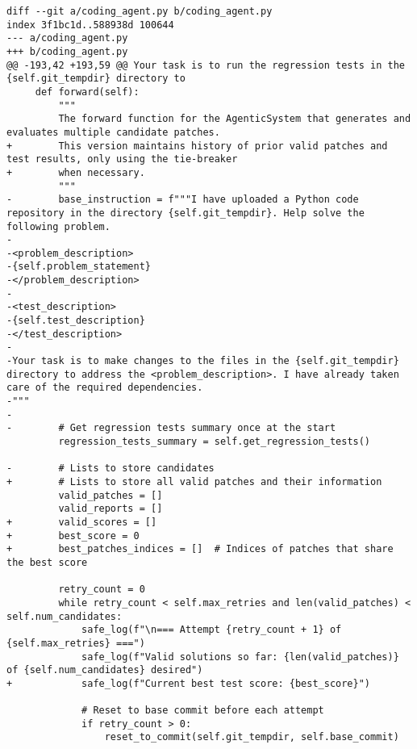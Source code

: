 \begin{lstlisting}[style=diffstyle]
diff --git a/coding_agent.py b/coding_agent.py
index 3f1bc1d..588938d 100644
--- a/coding_agent.py
+++ b/coding_agent.py
@@ -193,42 +193,59 @@ Your task is to run the regression tests in the {self.git_tempdir} directory to
     def forward(self):
         """
         The forward function for the AgenticSystem that generates and evaluates multiple candidate patches.
+        This version maintains history of prior valid patches and test results, only using the tie-breaker
+        when necessary.
         """
-        base_instruction = f"""I have uploaded a Python code repository in the directory {self.git_tempdir}. Help solve the following problem.
-
-<problem_description>
-{self.problem_statement}
-</problem_description>
-
-<test_description>
-{self.test_description}
-</test_description>
-
-Your task is to make changes to the files in the {self.git_tempdir} directory to address the <problem_description>. I have already taken care of the required dependencies.
-"""
-
-        # Get regression tests summary once at the start
         regression_tests_summary = self.get_regression_tests()
 
-        # Lists to store candidates
+        # Lists to store all valid patches and their information
         valid_patches = []
         valid_reports = []
+        valid_scores = []
+        best_score = 0
+        best_patches_indices = []  # Indices of patches that share the best score
 
         retry_count = 0
         while retry_count < self.max_retries and len(valid_patches) < self.num_candidates:
             safe_log(f"\n=== Attempt {retry_count + 1} of {self.max_retries} ===")
             safe_log(f"Valid solutions so far: {len(valid_patches)} of {self.num_candidates} desired")
+            safe_log(f"Current best test score: {best_score}")
 
             # Reset to base commit before each attempt
             if retry_count > 0:
                 reset_to_commit(self.git_tempdir, self.base_commit)
             

\end{lstlisting}
